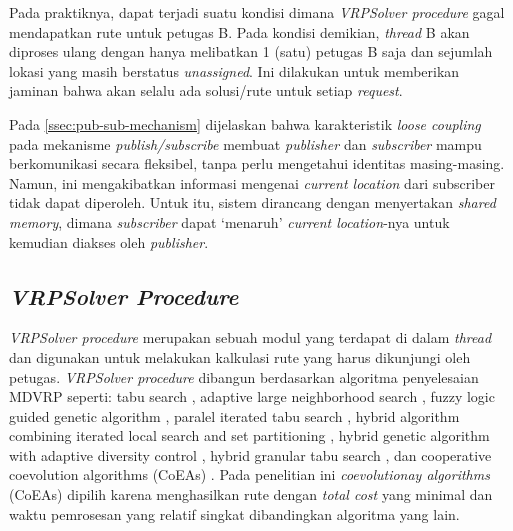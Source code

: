 Pada praktiknya, dapat terjadi suatu kondisi dimana \textit{VRPSolver procedure} gagal mendapatkan rute untuk petugas B. Pada kondisi demikian, \textit{thread} B akan diproses ulang dengan hanya melibatkan 1 (satu) petugas B saja dan sejumlah lokasi yang masih berstatus \textit{unassigned}. Ini dilakukan untuk memberikan jaminan bahwa akan selalu ada solusi/rute untuk setiap \textit{request}. 


Pada \autoref{ssec:pub-sub-mechanism} dijelaskan bahwa karakteristik \textit{loose coupling} pada mekanisme \textit{publish/subscribe} membuat \textit{publisher} dan \textit{subscriber} mampu berkomunikasi secara fleksibel, tanpa perlu mengetahui identitas masing-masing. Namun, ini mengakibatkan informasi mengenai \textit{current location} dari subscriber tidak dapat diperoleh. Untuk itu, sistem dirancang dengan menyertakan \textit{shared memory}, dimana \textit{subscriber} dapat `menaruh' \textit{current location}-nya untuk kemudian diakses oleh \textit{publisher}. 


%
%


\subsection{\textit{VRPSolver Procedure}}
\label{ssec:vrp-solver}
\textit{VRPSolver procedure} merupakan sebuah modul yang terdapat di dalam \textit{thread} dan digunakan untuk melakukan kalkulasi rute yang harus dikunjungi oleh petugas. \textit{VRPSolver procedure} dibangun berdasarkan algoritma penyelesaian MDVRP seperti: tabu search \cite{cordeau_tabu_1997}, adaptive large neighborhood search  \citep{pisinger_general_2007}, fuzzy logic guided genetic algorithm \citep{lau_application_2010}, paralel iterated tabu search \citep{cordeau_parallel_2012}, hybrid algorithm combining iterated local search and set partitioning \citep{subramanian_hybrid_2013}, hybrid genetic algorithm with adaptive diversity control \citep{vidal_implicit_2014}, hybrid granular tabu search \citep{escobar_hybrid_2014}, dan cooperative coevolution algorithms (CoEAs) \citep{de_oliveira_cooperative_2016}. Pada penelitian ini \textit{coevolutionay algorithms} (CoEAs) dipilih karena menghasilkan rute dengan \textit{total cost} yang minimal dan waktu pemrosesan yang relatif singkat dibandingkan algoritma yang lain.


